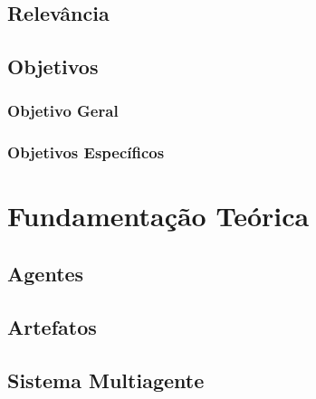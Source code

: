 \documentclass[openright]{normas-utf-tex} %
\begin{document}
		
	
	\section{Relevância}

		

	\section{Objetivos}

		

		\subsection{Objetivo Geral}

			
			
		\subsection{Objetivos Específicos}

			



\chapter{Fundamentação Teórica}
\label{chap:fundteoric}

	\section{Agentes} \label{agent}
 
		

	\section{Artefatos} \label{artefact}

		
 
	\section{Sistema Multiagente} \label{sma}
\end{document}

